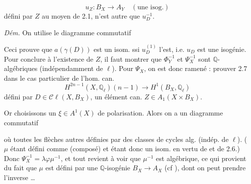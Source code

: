 \documentclass[11pt,a4paper]{article}
\begin{document}
 
\[
  u_{Z} : B_{X} \longrightarrow A_{Y} \quad (\text{une isog.})
\]
défini par $Z$ au moyen de 2.1, n'est autre que $u_{D}^{-1}$.

\emph{Dém.} On utilise le diagramme commutatif



Ceci prouve que $a(\gamma(D))$ est un isom. ssi $u_{D}^{(1)}$ l'est, i.e. $u_{D}$ est une
isogénie. Pour conclure à l'existence de $Z$, il faut montrer que $\Phi_{Y}^{-1}$ et
$\Psi_{X}^{-1}$ sont $\mathbb{Q}$-algébriques (indépendamment de $\ell$). 
  Pour $\Psi_{X}$, on est donc ramené :
prouver 2.7 dans le cas particulier de l'hom. can.
\[
  H^{2n-1}(X, \mathbb{Q}_{\ell})(n-1) \longrightarrow H^{1}(B_{X}, \mathbb{Q}_{\ell})
\]
défini par $D \in \mathcal{C}\ell(X, B_{X})$,  un élément can.
$Z \in A_{1}(X \times B_{X})$.

Or choisissons un $\xi \in A^{1}(X)$ de polarisation. Alors on a un diagramme commutatif



où toutes les flèches  autres  définies par des classes de
cycles alg. (indép. de $\ell$). ($\mu$ étant défini comme 
(composé) et étant donc un isom. en vertu de \ill{} et de 2.6.)
Donc $\Psi_{X}^{-1} = \lambda\varphi\mu^{-1}$, et tout revient à voir que $\mu^{-1}$ est
algébrique, ce qui provient du fait que $\mu$ est défini par une $\mathbb{Q}$-isogénie
$B_{X} \to A_{X}$ (cf \ill{}), dont on peut prendre l'inverse …
\end{document}
